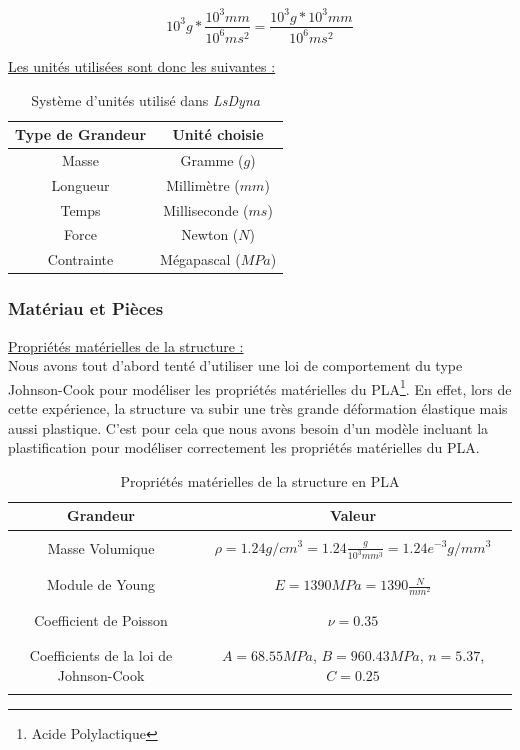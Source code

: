 \documentclass[a4paper]{article}
\begin{document}
	$$10^{3}g * \frac{10^{3}mm}{10^{6}ms^{2}} = \frac{10^{3}g * 10^{3}mm}{10^{6}ms^{2}}$$
	
	\hspace{0.5cm}\underline{Les unités utilisées sont donc les suivantes :}
	
	\begin{table}[!h]
		\centering
		\begin{tabular}{|c|c|}
			\hline
			\rowcolor{Gray}
			\textbf{Type de Grandeur} & \textbf{Unité choisie}\\\hline\hline
			Masse & Gramme ($g$)\\\hline
			Longueur & Millimètre ($mm$)\\\hline
			Temps & Milliseconde ($ms$)\\\hline
			Force & Newton ($N$)\\\hline
			Contrainte & Mégapascal ($MPa$)\\\hline
		\end{tabular}
		\caption{Système d'unités utilisé dans \textit{LsDyna}}
	\end{table}
	
	\subsubsection{Matériau et Pièces}
	\hspace{0.5cm}\underline{Propriétés matérielles de la structure :}\\
	
	\hspace{0.5cm}Nous avons tout d'abord tenté d'utiliser une loi de comportement du type Johnson-Cook pour modéliser les propriétés matérielles du PLA\footnote{Acide Polylactique}. En effet, lors de cette expérience, la structure va subir une très grande déformation élastique mais aussi plastique. C'est pour cela que nous avons besoin d'un modèle incluant la plastification pour modéliser correctement les propriétés matérielles du PLA.
	
	\begin{table}[!h]
		\centering
		\begin{tabular}{|c|c|}
			\hline
			\rowcolor{Gray}
			\textbf{Grandeur} & \textbf{Valeur}\\\hline\hline
			& \\
			Masse Volumique & $\rho = 1.24g/cm^{3} = 1.24 \frac{g}{10^{3}mm^{3}} = 1.24e^{-3} g/mm^{3}$\\
			& \\\hline
			& \\
			Module de Young & $E = 1 390 MPa = 1 390 \frac{N}{mm^{2}}$\\
			& \\\hline
			& \\
			Coefficient de Poisson & $\nu = 0.35$\\
			& \\\hline
			& \\
			Coefficients de la loi de Johnson-Cook & $A = 68.55 MPa$, $B=960.43 MPa$, $n=5.37$, $C=0.25$\\
			& \\\hline
		\end{tabular}
		\caption{Propriétés matérielles de la structure en PLA}
	\end{table}
	
\end{document}
